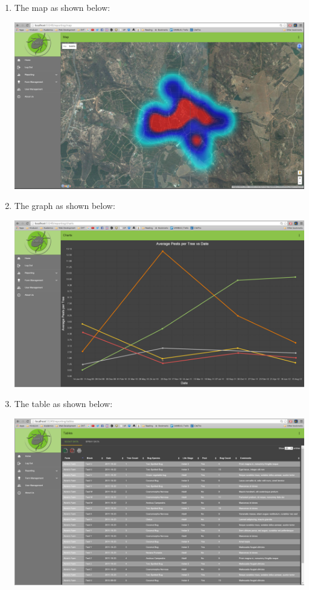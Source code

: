 \documentclass[11pt,a4paper,titlepage]{article}
\begin{document}
\begin{enumerate}
		\begin{enumerate}
			\item The map as shown below:
			\begin{center}
				\includegraphics[width=\linewidth]{map.png}
			\end{center}
\item The graph as shown below:
			\begin{center}
				\includegraphics[width=\linewidth]{graph.png}
			\end{center}
\item The table as shown below:
			\begin{center}
				\includegraphics[width=\linewidth]{table.png}

\end{center}
\end{enumerate}
\end{enumerate}
\end{document}
